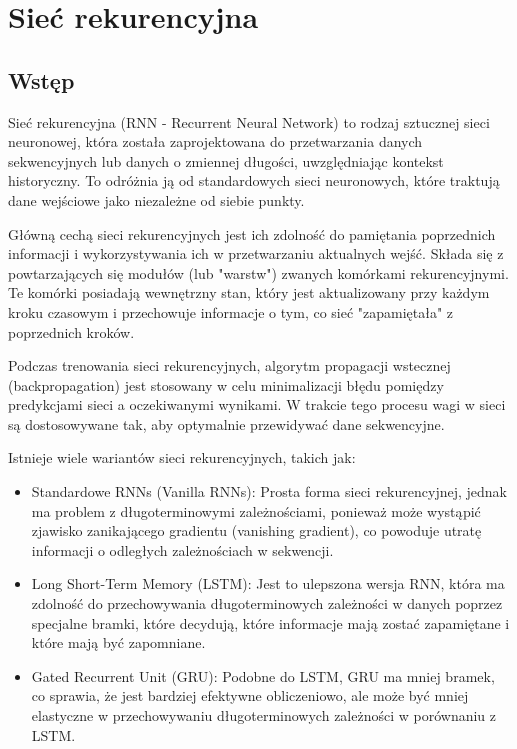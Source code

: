 \documentclass{article}
\begin{document}
\section{Sieć rekurencyjna}

\subsection{Wstęp}

Sieć rekurencyjna (RNN - Recurrent Neural Network) to rodzaj sztucznej sieci neuronowej, która została zaprojektowana do przetwarzania danych sekwencyjnych lub danych o zmiennej długości, uwzględniając kontekst historyczny. To odróżnia ją od standardowych sieci neuronowych, które traktują dane wejściowe jako niezależne od siebie punkty.

Główną cechą sieci rekurencyjnych jest ich zdolność do pamiętania poprzednich informacji i wykorzystywania ich w przetwarzaniu aktualnych wejść. Składa się z powtarzających się modułów (lub "warstw") zwanych komórkami rekurencyjnymi. Te komórki posiadają wewnętrzny stan, który jest aktualizowany przy każdym kroku czasowym i przechowuje informacje o tym, co sieć "zapamiętała" z poprzednich kroków.

Podczas trenowania sieci rekurencyjnych, algorytm propagacji wstecznej (backpropagation) jest stosowany w celu minimalizacji błędu pomiędzy predykcjami sieci a oczekiwanymi wynikami. W trakcie tego procesu wagi w sieci są dostosowywane tak, aby optymalnie przewidywać dane sekwencyjne.

Istnieje wiele wariantów sieci rekurencyjnych, takich jak:
\begin{itemize}
    \item Standardowe RNNs (Vanilla RNNs): Prosta forma sieci rekurencyjnej, jednak ma problem z długoterminowymi zależnościami, ponieważ może wystąpić zjawisko zanikającego gradientu (vanishing gradient), co powoduje utratę informacji o odległych zależnościach w sekwencji.
    \item Long Short-Term Memory (LSTM): Jest to ulepszona wersja RNN, która ma zdolność do przechowywania długoterminowych zależności w danych poprzez specjalne bramki, które decydują, które informacje mają zostać zapamiętane i które mają być zapomniane.
    \item Gated Recurrent Unit (GRU): Podobne do LSTM, GRU ma mniej bramek, co sprawia, że jest bardziej efektywne obliczeniowo, ale może być mniej elastyczne w przechowywaniu długoterminowych zależności w porównaniu z LSTM.
\end{itemize}
\end{document}
